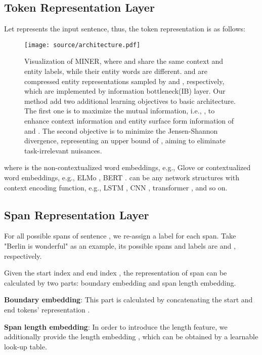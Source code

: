 \documentclass[11pt]{article}
\begin{document}
\subsection{Token Representation Layer}
Let  represents the input sentence, thus, the token representation  is as follows:




\begin{figure*}[t]
\centering
  \texttt{[image: source/architecture.pdf]}
  \caption{Visualization of MINER, where  and  share the same context and entity labels, while their entity words are different.  and  are compressed entity representations sampled by  and , respectively, which are implemented by information bottleneck(IB) layer. Our method add two additional learning objectives to basic architecture. The first one is to maximize the mutual information, i.e., , to enhance context information and entity surface form information of  and . The second objective is to minimize the Jensen-Shannon divergence, representing an upper bound of , aiming to eliminate task-irrelevant nuisances.}
 \label{fig:trans}
\end{figure*}


where  is the non-contextualized word embeddings, e.g., Glove \cite{pennington-etal-2014-glove} or contextualized word embeddings, e.g., ELMo \cite{peters-etal-2018-deep}, BERT \cite{devlin2018bert}.  can be any network structures with context encoding function, e.g., LSTM \cite{hochreiter1997long}, CNN \cite{lecun1995convolutional}, transformer \cite{vaswani2017attention}, and so on. 

\subsection{Span Representation Layer}
For all possible spans  of sentence , we re-assign a label  for each span. Take "Berlin is wonderful" as an example, its possible spans and labels are  and , respectively.

Given the start index  and end index , the representation of span  can be calculated by two parts: boundary embedding and span length embedding.

\textbf{Boundary embedding}: This part is calculated by concatenating the start and end tokens' representation .

\textbf{Span length embedding}: In order to introduce the length feature, we additionally provide the length embedding , which can be obtained by a learnable look-up table.
\end{document}
